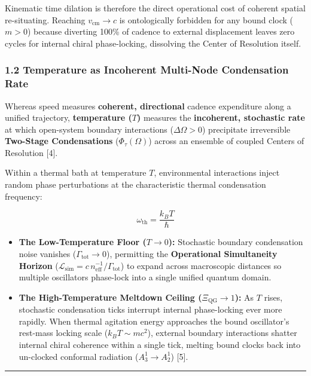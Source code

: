 \documentclass[
]{article}
\providecommand{\tightlist}{%
  \setlength{\itemsep}{0pt}\setlength{\parskip}{0pt}}
\begin{document}
Kinematic time dilation is therefore the direct operational cost of
coherent spatial re-situating. Reaching \(v_{\mathrm{cm}} \to c\) is
ontologically forbidden for any bound clock (\(m > 0\)) because
diverting 100\% of cadence to external displacement leaves zero cycles
for internal chiral phase-locking, dissolving the Center of Resolution
itself.

\subsubsection{1.2 Temperature as Incoherent Multi-Node Condensation
Rate}\label{temperature-as-incoherent-multi-node-condensation-rate}

Whereas speed measures \textbf{coherent, directional} cadence
expenditure along a unified trajectory, \textbf{temperature (\(T\))}
measures the \textbf{incoherent, stochastic rate} at which open-system
boundary interactions (\(\Delta\Omega > 0\)) precipitate irreversible
\textbf{Two-Stage Condensations} (\(\Phi_\tau(\Omega)\)) across an
ensemble of coupled Centers of Resolution {[}4{]}.

Within a thermal bath at temperature \(T\), environmental interactions
inject random phase perturbations at the characteristic thermal
condensation frequency:

\[\omega_{\mathrm{th}} = \frac{k_B T}{\hbar}\]

\begin{itemize}
\tightlist
\item
  \textbf{The Low-Temperature Floor (\(T \to 0\)):} Stochastic boundary
  condensation noise vanishes (\(\Gamma_{\mathrm{tot}} \to 0\)),
  permitting the \textbf{Operational Simultaneity Horizon}
  (\(\mathcal{L}_{\mathrm{sim}} = c\,n_{\mathrm{eff}}^{-1}/\Gamma_{\mathrm{tot}}\))
  to expand across macroscopic distances so multiple oscillators
  phase-lock into a single unified quantum domain.
\item
  \textbf{The High-Temperature Meltdown Ceiling
  (\(\Xi_{\mathrm{QG}} \to 1\)):} As \(T\) rises, stochastic
  condensation ticks interrupt internal phase-locking ever more rapidly.
  When thermal agitation energy approaches the bound oscillator's
  rest-mass locking scale (\(k_B T \sim m c^2\)), external boundary
  interactions shatter internal chiral coherence within a single tick,
  melting bound clocks back into un-clocked conformal radiation
  (\(A_3^1 \to A_2^1\)) {[}5{]}.
\end{itemize}

\begin{center}\rule{0.5\linewidth}{0.5pt}\end{center}
\end{document}

